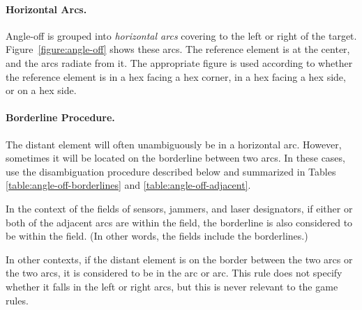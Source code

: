 {\paragraph{Horizontal Arcs.} 

Angle-off is grouped into \emph{horizontal arcs} covering  to the left or right of the target. Figure~\ref{figure:angle-off} shows these arcs. The reference element is at the center, and the arcs radiate from it. The appropriate figure is used according to whether the reference element is in a hex facing a hex corner, in a hex facing a hex side, or on a hex side.

\paragraph{Borderline Procedure.} 

The distant element will often unambiguously be in a horizontal arc. However, sometimes it will be located on the borderline between two arcs. In these cases, use the disambiguation procedure described below and summarized in Tables \ref{table:angle-off-borderlines} and \ref{table:angle-off-adjacent}.

In the context of the fields of sensors, jammers, and laser designators, if either or both of the adjacent arcs are within the field, the borderline is also considered to be within the field. (In other words, the fields include the borderlines.)

In other contexts, if the distant element is on the border between the two  arcs or the two  arcs, it is considered to be in the  arc or  arc. This rule does not specify whether it falls in the left or right arcs, but this is never relevant to the game rules. 


}
